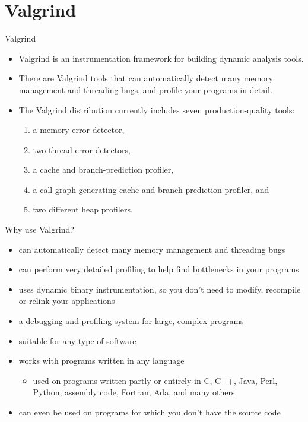 \documentclass[10pt,t]{beamer}
\begin{document}
\section{Valgrind}
\begin{frame}{Valgrind}
  \begin{itemize}
  \item Valgrind is an instrumentation framework for building dynamic analysis tools.
  \item  There are Valgrind tools that can automatically detect many memory management and threading bugs, and profile your programs in detail.
  \item The Valgrind distribution currently includes seven production-quality tools: 
    \begin{enumerate}
      \item a memory error detector, 
      \item two thread error detectors, 
      \item a cache and branch-prediction profiler,
      \item a call-graph generating cache and branch-prediction profiler, and
      \item two different heap profilers.
    \end{enumerate}
  \end{itemize}
\end{frame}

\begin{frame}{Why use Valgrind?}
  \begin{itemize}
  \item can automatically detect many memory management and threading bugs
  \item can perform very detailed profiling to help find bottlenecks in your programs
  \item uses dynamic binary instrumentation, so you don't need to modify, recompile or relink your applications
  \item a debugging and profiling system for large, complex programs
  \item suitable for any type of software
  \item works with programs written in any language
    \begin{itemize}
      \item used on programs written partly or entirely in C, C++, Java, Perl, Python, assembly code, Fortran, Ada, and many others
    \end{itemize}
  \item can even be used on programs for which you don't have the source code
  \end{itemize}
\end{frame}
\end{document}
